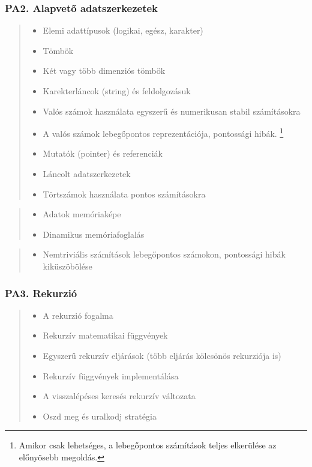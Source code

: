 \documentclass[a4paper,11pt,oneside]{article}
\newcommand{\cmark}{\ding{51}}%
\newcommand{\xmark}{\ding{55}}%
\newcommand{\CC}[1]{#1}
\newcommand{\cincl}{{\small\cmark}}
\newcommand{\ccode}{{\small\cmark\faFileText}}
\newcommand{\cnfoc}{{\small\faQuestion}}
\newcommand{\cemay}{{\small\xmark\faQuestionCircle}}
\newcommand{\cexcl}{{\small\xmark}}
\newcommand{\Iincluded}{\item[\hbox to 1.8em{\cincl\hfill}]}
\newcommand{\Icodeonly}{\item[\hbox to 1.8em{\ccode\hfill}]}
\newcommand{\Inofocus}{\item[\hbox to 1.8em{\cnfoc\hfill}]}
\newcommand{\Iexmaybe}{\item[\hbox to 1.8em{\cemay\hfill}]}
\newcommand{\Iexcluded}{\item[\hbox to 1.8em{\cexcl\hfill}]}
\newenvironment{myitemize}{\begin{quote}\begin{itemize}\itemsep 0pt}{\end{itemize}\end{quote}}
\begin{document}
    \subsubsection*{PA2. Alapvető adatszerkezetek} %

    \begin{myitemize}
    \Iincluded\CC{Elemi adattípusok} (logikai, egész, karakter) %
    \Iincluded\CC{Tömbök}  %
    \Iincluded\CC{Két vagy több dimenziós tömbök}
    \Iincluded\CC{Karekterláncok (string) és feldolgozásuk} %
    \Icodeonly\CC{Valós számok használata egyszerű és numerikusan stabil számításokra} %
    \Icodeonly A valós számok lebegőpontos reprezentációja, pontossági hibák. \footnote{Amikor csak lehetséges, a lebegőpontos számítások teljes elkerülése az előnyösebb megoldás.}
    \Icodeonly\CC{Mutatók (pointer) és referenciák}
    \Iexmaybe \CC{Láncolt adatszerkezetek} %
    \Iexmaybe Törtszámok használata pontos számításokra %
    
    \end{myitemize}

    \begin{myitemize}
    \Inofocus \CC{Adatok memóriaképe} %
    \Inofocus \CC{Dinamikus memóriafoglalás} %
    \end{myitemize}
    
    \begin{myitemize}
    \Iexcluded Nemtriviális számítások lebegőpontos számokon, pontossági hibák kiküszöbölése %
    \end{myitemize}

    \subsubsection*{PA3. Rekurzió} %

    \begin{myitemize}
    \Iincluded\CC{A rekurzió fogalma} %
    \Iincluded\CC{Rekurzív matematikai függvények} %
    \Iincluded\CC{Egyszerű rekurzív eljárások} (több eljárás kölcsönös rekurziója is) %
    \Icodeonly\CC{Rekurzív függvények implementálása} %
    \Icodeonly\CC{A visszalépéses keresés rekurzív változata} %
    \Iexmaybe \CC{Oszd meg és uralkodj stratégia} %
    \end{myitemize}
\end{document}
